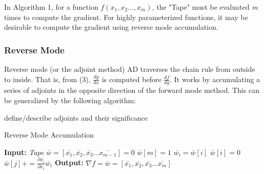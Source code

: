 \documentclass[oneside]{article}
\begin{document}
In Algorithm 1, for a function $f(x_1,x_2..., x_m)$, the "Tape" must be evaluated \textit{m} times to compute the gradient. For highly parameterized functions, it may be desirable to compute the gradient using reverse mode accumulation.

\subsubsection{Reverse Mode}

Reverse mode (or the adjoint method) AD traverses the chain rule from outside to inside. That is, from (3),  \textit{$\frac{dg}{dx}$} is computed before \textit{$\frac{df}{dg}$}. It works by accumulating a series of adjoints in the opposite direction of the forward mode method. This can be generalized by the following algorithm:

\begin{editnote}
define/describe adjoints and their significance
\end{editnote}

\begin{algorithm*}
  \caption{Reverse Mode Accumulation \cite{griewank2}}
  \begin{algorithmic}[1]
\State \textbf{Input:} \textit{Tape}
\State $\bar{w} = [\bar{ x_1},\bar{x_2},\bar{x_3}...\bar{x_{m-1}}] = 0$
\State $\bar{w}[m] = 1$
\State $\bar{w_i}=\bar{w}[i]$
\State $\bar{w}[i] = 0$
\State $\bar{w}[j] +=  \frac{\partial \phi_i}{\partial x_i}\bar{w_i}$
\EndFor
\EndFor
\State \textbf{Output:} $\nabla f = \bar{w} =  [\bar{ x_1},\bar{x_2},\bar{x_3}...\bar{x_{m}}]$
\end{algorithmic}
 \end{algorithm*}
\end{document}
